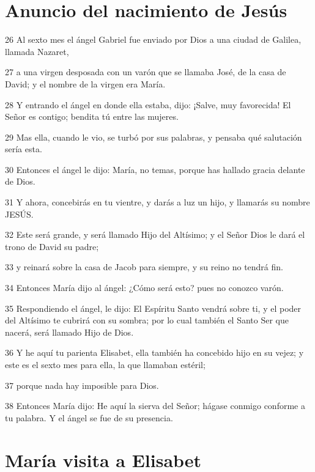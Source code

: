 \section*{Anuncio del nacimiento de Jesús}

\par 26 Al sexto mes el ángel Gabriel fue enviado por Dios a una ciudad de Galilea, llamada Nazaret,
\par 27 a una virgen desposada con un varón que se llamaba José, de la casa de David; y el nombre de la virgen era María.
\par 28 Y entrando el ángel en donde ella estaba, dijo: ¡Salve, muy favorecida! El Señor es contigo; bendita tú entre las mujeres.
\par 29 Mas ella, cuando le vio, se turbó por sus palabras, y pensaba qué salutación sería esta.
\par 30 Entonces el ángel le dijo: María, no temas, porque has hallado gracia delante de Dios.
\par 31 Y ahora, concebirás en tu vientre, y darás a luz un hijo, y llamarás su nombre JESÚS.
\par 32 Este será grande, y será llamado Hijo del Altísimo; y el Señor Dios le dará el trono de David su padre;
\par 33 y reinará sobre la casa de Jacob para siempre, y su reino no tendrá fin.
\par 34 Entonces María dijo al ángel: ¿Cómo será esto? pues no conozco varón.
\par 35 Respondiendo el ángel, le dijo: El Espíritu Santo vendrá sobre ti, y el poder del Altísimo te cubrirá con su sombra; por lo cual también el Santo Ser que nacerá, será llamado Hijo de Dios.
\par 36 Y he aquí tu parienta Elisabet, ella también ha concebido hijo en su vejez; y este es el sexto mes para ella, la que llamaban estéril;
\par 37 porque nada hay imposible para Dios.
\par 38 Entonces María dijo: He aquí la sierva del Señor; hágase conmigo conforme a tu palabra. Y el ángel se fue de su presencia.

\section*{María visita a Elisabet}

